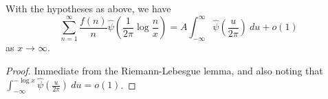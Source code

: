 \begin{corollary}
\label{limiting-cor}
\leanok
With the hypotheses as above, we have
  $$ \sum_{n=1}^\infty \frac{f(n)}{n} \hat \psi( \frac{1}{2\pi} \log \frac{n}{x} )
    = A \int_{-\infty}^\infty \hat \psi(\frac{u}{2\pi})\ du + o(1)$$
  as $x \to \infty$.
\end{corollary}
\begin{proof}
\leanok
Immediate from the Riemann-Lebesgue lemma, and also noting that
  $\int_{-\infty}^{-\log x} \hat \psi(\frac{u}{2\pi})\ du = o(1)$.
\end{proof}
